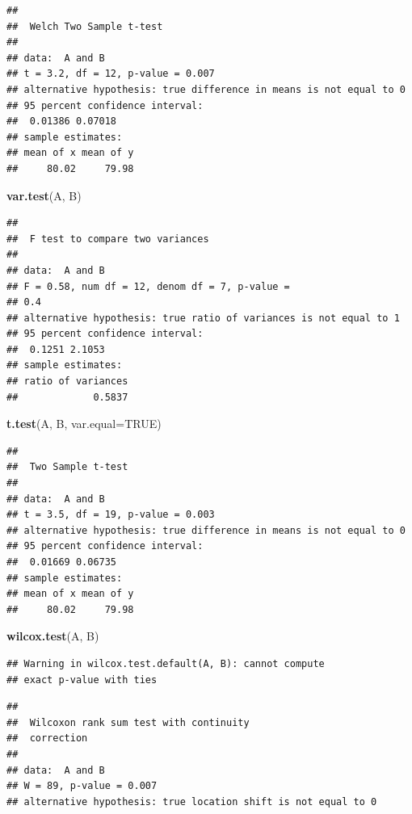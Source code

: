 \documentclass[10pt,]{krantz}
\makeatletter
\newenvironment{Shaded}{\begin{snugshade}}{\end{snugshade}}
\newcommand{\KeywordTok}[1]{\textcolor[rgb]{0.13,0.29,0.53}{\textbf{#1}}}
\newcommand{\DataTypeTok}[1]{\textcolor[rgb]{0.13,0.29,0.53}{#1}}
\newcommand{\OtherTok}[1]{\textcolor[rgb]{0.56,0.35,0.01}{#1}}
\newcommand{\NormalTok}[1]{#1}
\newenvironment{kframe}{%
\medskip{}
\setlength{\fboxsep}{.8em}
 \def\at@end@of@kframe{}%
 \ifinner\ifhmode%
  \def\at@end@of@kframe{\end{minipage}}%
  \begin{minipage}{\columnwidth}%
 \fi\fi%
 \def\FrameCommand##1{\hskip\@totalleftmargin \hskip-\fboxsep
 \colorbox{shadecolor}{##1}\hskip-\fboxsep
     \hskip-\linewidth \hskip-\@totalleftmargin \hskip\columnwidth}%
 \MakeFramed {\advance\hsize-\width
   \@totalleftmargin\z@ \linewidth\hsize
   \@setminipage}}%
 {\par\unskip\endMakeFramed%
 \at@end@of@kframe}
\renewenvironment{Shaded}{\begin{kframe}}{\end{kframe}}
\makeatother
\begin{document}
\begin{verbatim}
## 
##  Welch Two Sample t-test
## 
## data:  A and B
## t = 3.2, df = 12, p-value = 0.007
## alternative hypothesis: true difference in means is not equal to 0
## 95 percent confidence interval:
##  0.01386 0.07018
## sample estimates:
## mean of x mean of y 
##     80.02     79.98
\end{verbatim}

\begin{Shaded}
\begin{Highlighting}[]
\KeywordTok{var.test}\NormalTok{(A, B)}
\end{Highlighting}
\end{Shaded}

\begin{verbatim}
## 
##  F test to compare two variances
## 
## data:  A and B
## F = 0.58, num df = 12, denom df = 7, p-value =
## 0.4
## alternative hypothesis: true ratio of variances is not equal to 1
## 95 percent confidence interval:
##  0.1251 2.1053
## sample estimates:
## ratio of variances 
##             0.5837
\end{verbatim}

\begin{Shaded}
\begin{Highlighting}[]
\KeywordTok{t.test}\NormalTok{(A, B, }\DataTypeTok{var.equal=}\OtherTok{TRUE}\NormalTok{)}
\end{Highlighting}
\end{Shaded}

\begin{verbatim}
## 
##  Two Sample t-test
## 
## data:  A and B
## t = 3.5, df = 19, p-value = 0.003
## alternative hypothesis: true difference in means is not equal to 0
## 95 percent confidence interval:
##  0.01669 0.06735
## sample estimates:
## mean of x mean of y 
##     80.02     79.98
\end{verbatim}

\begin{Shaded}
\begin{Highlighting}[]
\KeywordTok{wilcox.test}\NormalTok{(A, B)}
\end{Highlighting}
\end{Shaded}

\begin{verbatim}
## Warning in wilcox.test.default(A, B): cannot compute
## exact p-value with ties
\end{verbatim}

\begin{verbatim}
## 
##  Wilcoxon rank sum test with continuity
##  correction
## 
## data:  A and B
## W = 89, p-value = 0.007
## alternative hypothesis: true location shift is not equal to 0
\end{verbatim}
\end{document}
